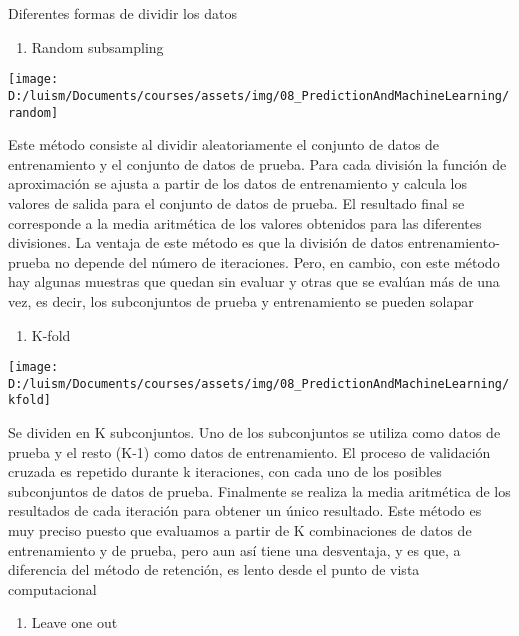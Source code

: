 \documentclass[
]{article}
\providecommand{\tightlist}{%
  \setlength{\itemsep}{0pt}\setlength{\parskip}{0pt}}
\begin{document}
Diferentes formas de dividir los datos

\begin{enumerate}
\def\labelenumi{\arabic{enumi}.}
\tightlist
\item
  Random subsampling
\end{enumerate}

\begin{center}\texttt{[image: D:/luism/Documents/courses/assets/img/08\_PredictionAndMachineLearning/random]} \end{center}

Este método consiste al dividir aleatoriamente el conjunto de datos de
entrenamiento y el conjunto de datos de prueba. Para cada división la
función de aproximación se ajusta a partir de los datos de entrenamiento
y calcula los valores de salida para el conjunto de datos de prueba. El
resultado final se corresponde a la media aritmética de los valores
obtenidos para las diferentes divisiones. La ventaja de este método es
que la división de datos entrenamiento-prueba no depende del número de
iteraciones. Pero, en cambio, con este método hay algunas muestras que
quedan sin evaluar y otras que se evalúan más de una vez, es decir, los
subconjuntos de prueba y entrenamiento se pueden solapar

\begin{enumerate}
\def\labelenumi{\arabic{enumi}.}
\setcounter{enumi}{1}
\tightlist
\item
  K-fold
\end{enumerate}

\begin{center}\texttt{[image: D:/luism/Documents/courses/assets/img/08\_PredictionAndMachineLearning/kfold]} \end{center}

Se dividen en K subconjuntos. Uno de los subconjuntos se utiliza como
datos de prueba y el resto (K-1) como datos de entrenamiento. El proceso
de validación cruzada es repetido durante k iteraciones, con cada uno de
los posibles subconjuntos de datos de prueba. Finalmente se realiza la
media aritmética de los resultados de cada iteración para obtener un
único resultado. Este método es muy preciso puesto que evaluamos a
partir de K combinaciones de datos de entrenamiento y de prueba, pero
aun así tiene una desventaja, y es que, a diferencia del método de
retención, es lento desde el punto de vista computacional

\begin{enumerate}
\def\labelenumi{\arabic{enumi}.}
\setcounter{enumi}{2}
\tightlist
\item
  Leave one out
\end{enumerate}
\end{document}
